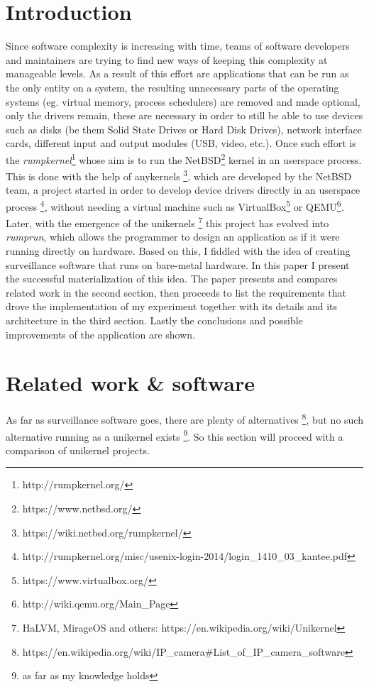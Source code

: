 \documentclass[10pt,a4paper,twoside]{article}
\begin{document}
\section{Introduction}
Since software complexity is increasing with time, teams of software developers and maintainers are trying to
find new ways of keeping this complexity at manageable levels. As a result of this effort are applications
that can be run as the only entity on a system,
the resulting unnecessary parts of the operating systems (eg. virtual memory, process schedulers) are removed
and made optional, only the drivers
remain, these are necessary in order to still be able to use devices
such as disks (be them Solid State Drives or Hard Disk Drives), network interface cards, different input and
output modules (USB, video, etc.).
Once such effort is the \textit{rumpkernel}\footnote{http://rumpkernel.org/}
 whose aim is to run the NetBSD\footnote{https://www.netbsd.org/} kernel in an userspace process.
 This is done with the help of anykernels \footnote{https://wiki.netbsd.org/rumpkernel/}, which are developed
 by the NetBSD team, a project started in order to develop device drivers directly in an userspace process
 \footnote{http://rumpkernel.org/misc/usenix-login-2014/login\_1410\_03\_kantee.pdf},
 without needing a virtual machine such as VirtualBox\footnote{https://www.virtualbox.org/} or
 QEMU\footnote{http://wiki.qemu.org/Main\_Page}.
Later, with the emergence of the unikernels
\footnote{HaLVM, MirageOS and others: https://en.wikipedia.org/wiki/Unikernel} this project has evolved into
\textit{rumprun}, which allows the programmer to design an application as if it were running directly on hardware.
Based on this, I fiddled with the idea of creating surveillance software that runs on bare-metal hardware.
In this paper I present the successful materialization of this idea.
The paper presents and compares related work in the second section, then proceeds to list the requirements that drove
the implementation of my experiment together with its details and its architecture in the third section. Lastly the
conclusions and possible improvements of the application are shown.

\section{Related work \& software}
As far as surveillance software goes, there are plenty of alternatives
\footnote{https://en.wikipedia.org/wiki/IP\_camera\#List\_of\_IP\_camera\_software},
 but no such alternative running as a unikernel exists
 \footnote{as far as my knowledge holds}.
 So this section will proceed with a comparison of unikernel projects.
\end{document}
